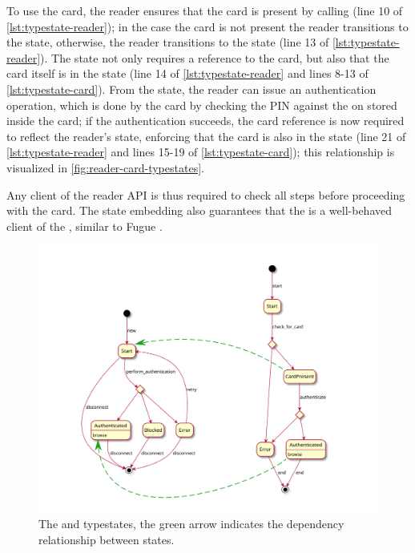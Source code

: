 To use the card, the reader ensures that the card is present by calling 
(line 10 of \autoref{lst:typestate-reader});
in the case the card is not present the reader transitions to the  state,
otherwise, the reader transitions to the  state (line 13 of \autoref{lst:typestate-reader}).
The  state not only requires a reference to the card,
but also that the card itself is in the  state (line 14 of \autoref{lst:typestate-reader}
and lines 8-13 of \autoref{lst:typestate-card}).
From the  state, the reader can issue an authentication operation,
which is done by the card by checking the PIN against the on stored inside the card;
if the authentication succeeds, the card reference is now required to reflect the reader's state,
enforcing that the card is also in the  state
(line 21 of \autoref{lst:typestate-reader} and lines 15-19 of \autoref{lst:typestate-card});
this relationship is visualized in \autoref{fig:reader-card-typestates}.

Any client of the reader API is thus required to check all steps before proceeding with the card.
The state embedding also guarantees that the  is a well-behaved client of the ,
similar to Fugue \autocite{DeLine2004}.

\begin{figure}
    \centering
    \includegraphics[width=\linewidth]{Chapters/Figures/C5/reader_typestates.pdf}
    \caption{The  and  typestates, the green arrow indicates the dependency relationship between states.}
    \label{fig:reader-card-typestates}
\end{figure}

